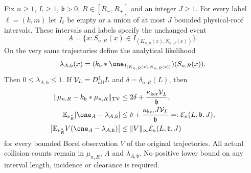 \begin{theorem}
\label{thm:av-likelihood}
Fix $n\ge1$, $L\ge1$, $\mathfrak b>0$, $R\in[R_-,R_+]$ and an
integer $J\ge1$.  For every label $\ell=(k,m)$ let $I_\ell$ be
empty or a union of at most $J$ bounded physical-roof intervals.
These intervals and labels specify the unchanged event
\[
 A=\{x:S_{n,R}(x)\in I_{(K_{n,R}(x),N_{n,R}(x))}\}.
\]
On the very same trajectories define the analytical likelihood
\begin{equation}\label{eq:av-likelihood-definition}
 \lambda_{A,\mathfrak b}(x)=
 (k_{\mathfrak b}*\one_{I_{(K_{n,R}(x),N_{n,R}(x))}})
                                            (S_{n,R}(x)).
\end{equation}
Then $0\le\lambda_{A,\mathfrak b}\le1$.  If
$\mathcal V_L=D_{\rm all}^{1}L$ and
$\delta=\delta_{n,R}(L)$, then
\begin{align}
 \|\mu_{n,R}-k_{\mathfrak b}*\mu_{n,R}\|_{\rm TV}
       &\le2\delta+\frac{\kappa_{\rm ker}\mathcal V_L}{\mathfrak b},
                                                       \label{eq:av-law-error}\\
 \mathbb E_{\nu_R^*}|\one_A-\lambda_{A,\mathfrak b}|
       &\le\delta+\frac{\kappa_{\rm ker}J\mathcal V_L}{\mathfrak b}
          =:\mathcal E_n(L,\mathfrak b,J),              \label{eq:av-event-error}\\
 \left|\mathbb E_{\nu_R^*}
             V(\one_A-\lambda_{A,\mathfrak b})\right|
       &\le\|V\|_\infty\mathcal E_n(L,\mathfrak b,J)
                                                       \label{eq:av-observation-error}
\end{align}
for every bounded Borel observation $V$ of the original trajectories.
All actual collision counts remain in $\mu_{n,R}$, $A$ and
$\lambda_{A,\mathfrak b}$.  No positive lower bound on any interval
length, incidence or clearance is required.
\end{theorem}

